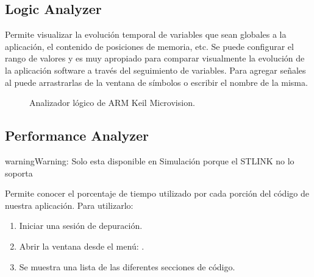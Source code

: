 \documentclass[letterpaper,10pt,english]{sphinxmanual}
\begin{document}
\subsection{Logic Analyzer}
\label{\detokenize{cmsis-rtos:logic-analyzer}}
\sphinxAtStartPar
Permite visualizar la evolución temporal de variables que sean globales a la aplicación, el contenido de posiciones de memoria, etc. Se puede configurar el rango de valores y es muy apropiado para comparar visualmente la evolución de la aplicación software a través del seguimiento de variables.
Para agregar señales al  puede arrastrarlas de la ventana de símbolos o escribir el nombre de la misma.

\begin{figure}[htbp]
\centering
\capstart

\noindent{}
\caption{Analizador lógico de ARM Keil Microvision.}\label{\detokenize{cmsis-rtos:id2}}\end{figure}


\subsection{Performance Analyzer}
\label{\detokenize{cmsis-rtos:performance-analyzer}}
\begin{sphinxadmonition}{warning}{Warning:}
\sphinxAtStartPar
Solo esta disponible en Simulación porque el ST\sphinxhyphen{}LINK no lo soporta
\end{sphinxadmonition}

\sphinxAtStartPar
Permite conocer el porcentaje de tiempo utilizado por cada porción del código de nuestra aplicación.
Para utilizarlo:
\begin{enumerate}
%
\item {} 
\sphinxAtStartPar
Iniciar una sesión de depuración.

\item {} 
\sphinxAtStartPar
Abrir la ventana desde el menú: .

\item {} 
\sphinxAtStartPar
Se muestra una lista de las diferentes secciones de código.

\end{enumerate}

\begin{figure}[htbp]
\centering

\noindent{}
\end{figure}
\end{document}
